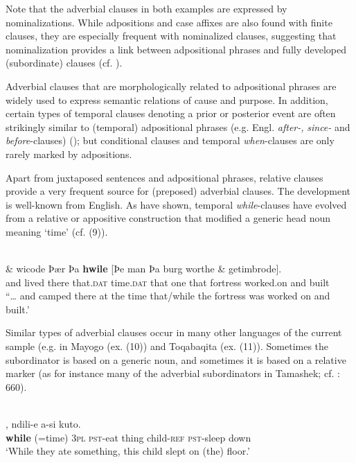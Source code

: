 \documentclass[output=paper]{langsci/langscibook}
\begin{document}
Note that the adverbial clauses in both examples are expressed by nominalizations. While adpositions and case affixes are also found with finite clauses, they are especially frequent with nominalized clauses, suggesting that nominalization provides a link between adpositional phrases and fully developed (subordinate) clauses (cf. \citealt{Deutscher2009,Heine2009}).

Adverbial clauses that are morphologically related to adpositional phrases are widely used to express semantic relations of cause and purpose. In addition, certain types of temporal clauses denoting a prior or posterior event are often strikingly similar to (temporal) adpositional phrases (e.g. Engl. \textit{after-,} \textit{since-} and \textit{before}-clauses) (\citealt{Blake1999,Hetterle2015}); but conditional clauses and temporal \textit{when}-clauses are only rarely marked by adpositions. 

Apart from juxtaposed sentences and adpositional phrases, relative clauses provide a very frequent source for (preposed) adverbial clauses. The development is well-known from English. As \citet{HopperTraugott2003} have shown, temporal \textit{while}-clauses have evolved from a relative or appositive construction that modified a generic head noun meaning ‘time’ (cf. (9)).

\ea\label{ex:key:}
\\
\gll   \& wicode    Þær   Þa   \textbf{hwile}  [Þe   man  Þa   burg  worthe  \& getimbrode].\\
       and  lived   there   that.\textsc{dat}   time.\textsc{dat}  that   one  that   fortress  worked.on  and built\\
\glt “… and camped there at the time that/while the fortress was worked on and built.'
\z

Similar types of adverbial clauses occur in many other languages of the current sample (e.g. in Mayogo (ex. (10)) and Toqabaqita (ex. (11)). Sometimes the subordinator is based on a generic noun, and sometimes it is based on a relative marker (as for instance many of the adverbial subordinators in Tamashek; cf. \citealt{Heath2005}: 660). 

\ea\label{ex:key:}
\\
,   ndili-e   a-si   kuto.\\
        \textbf{while} (=time)  \textsc{3pl}   \textsc{pst-}eat   thing   child-\textsc{ref}   \textsc{pst-}sleep   down\\
\glt   `While they ate something, this child slept on (the) floor.'
\z
\end{document}
